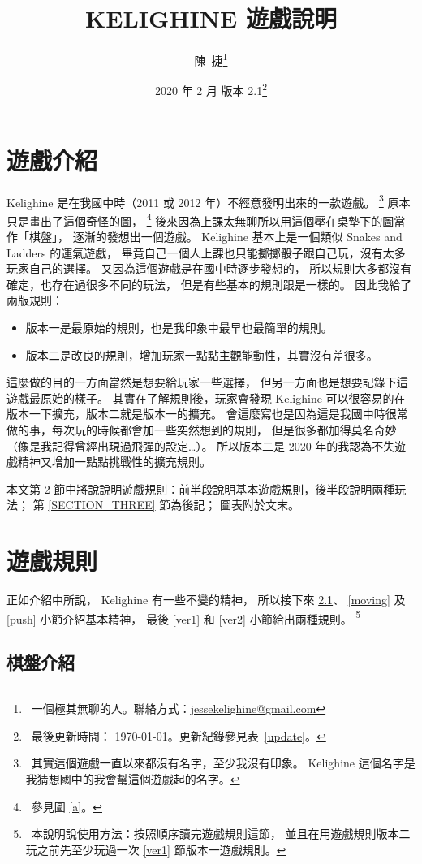 \documentclass[11pt,a4paper]{article}
\title{KELIGHINE 遊戲說明}
\author{陳\ 捷\thanks{\ 一個極其無聊的人。聯絡方式：\url{jessekelighine@gmail.com}}}
\date{2020 年 2 月 \quad 版本 2.1\thanks{\ 最後更新時間： \today。更新紀錄參見表\ \ref{update}。}}
\begin{document}
\maketitle

\section{遊戲介紹} %

Kelighine 是在我國中時（2011 或 2012 年）不經意發明出來的一款遊戲。
	\footnote{\ 其實這個遊戲一直以來都沒有名字，至少我沒有印象。
	Kelighine 這個名字是我猜想國中的我會幫這個遊戲起的名字。}
原本只是畫出了這個奇怪的圖，
	\footnote{\ 參見圖 \ref{a}。}
後來因為上課太無聊所以用這個壓在桌墊下的圖當作「棋盤」，
逐漸的發想出一個遊戲。
Kelighine 基本上是一個類似 Snakes and Ladders 的運氣遊戲，
畢竟自己一個人上課也只能擲擲骰子跟自己玩，沒有太多玩家自己的選擇。
又因為這個遊戲是在國中時逐步發想的，
所以規則大多都沒有確定，也存在過很多不同的玩法，
但是有些基本的規則跟是一樣的。
因此我給了兩版規則：
\begin{itemize}
	\item 版本一是最原始的規則，也是我印象中最早也最簡單的規則。
	\item 版本二是改良的規則，增加玩家一點點主觀能動性，其實沒有差很多。
\end{itemize}
這麼做的目的一方面當然是想要給玩家一些選擇，
但另一方面也是想要記錄下這遊戲最原始的樣子。
其實在了解規則後，玩家會發現 Kelighine 可以很容易的在版本一下擴充，版本二就是版本一的擴充。
會這麼寫也是因為這是我國中時很常做的事，每次玩的時候都會加一些突然想到的規則，
但是很多都加得莫名奇妙（像是我記得曾經出現過飛彈的設定…）。
所以版本二是 2020 年的我認為不失遊戲精神又增加一點點挑戰性的擴充規則。

本文第 \ref{SECTION_TWO} 節中將說說明遊戲規則：前半段說明基本遊戲規則，後半段說明兩種玩法；
第 \ref{SECTION_THREE} 節為後記；
圖表附於文末。

\section{遊戲規則} \label{SECTION_TWO}%

正如介紹中所說， Kelighine 有一些不變的精神，
所以接下來 \ref{board_intro}、 \ref{moving} 及 \ref{push} 小節介紹基本精神，
最後 \ref{ver1} 和 \ref{ver2} 小節給出兩種規則。
	\footnote{\ 本說明說使用方法：按照順序讀完遊戲規則這節，
	並且在用遊戲規則版本二玩之前先至少玩過一次 \ref{ver1} 節版本一遊戲規則。}

\subsection{棋盤介紹} \label{board_intro} %
\end{document}
